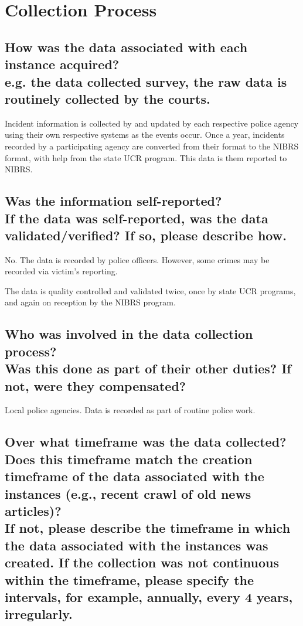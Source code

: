 \documentclass[letterpaper, 10 pt, conference]{ieeeconf}  %
\newcommand{\subtitle}[1]{{\\ \small \normalfont \color{purple} #1}}
\begin{document}
\section{Collection Process}

\subsection{How was the data associated with each instance acquired? \subtitle {e.g. the data collected survey, the raw data is routinely collected by the courts.}}

Incident information is collected by and updated by each respective police agency using their own respective systems as the events occur. Once a year, incidents recorded by a participating agency are converted from their format to the NIBRS format, with help from the state UCR program. This data is them reported to NIBRS. 

\subsection{Was the information self-reported? \subtitle{If the data was self-reported, was the data validated/verified? If so, please describe how.}}

No. The data is recorded by police officers. However, some crimes may be recorded via victim's reporting.

The data is quality controlled and validated twice, once by state UCR programs, and again on reception by the NIBRS program. 

\subsection{Who was involved in the data collection process? \subtitle{Was this done as part of their other duties? If not, were they compensated?}}

Local police agencies. Data is recorded as part of routine police work. 

\subsection{Over what timeframe was the data collected? Does this timeframe match the creation timeframe of the data associated with the instances (e.g., recent crawl of old news articles)? \subtitle{If not, please describe the timeframe in which the data associated with the instances was created. If the collection was not continuous within the timeframe, please specify the intervals, for example, annually, every 4 years, irregularly.}}
\end{document}
